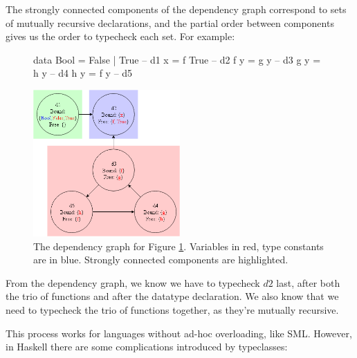 \documentclass[dissertation.tex]{subfiles}
\begin{document}
{{{            The strongly connected components of the dependency graph correspond to sets of mutually recursive
            declarations, and the partial order between components gives us the order to typecheck each set. For
            example:

            \begin{figure}[H]
                \begin{haskellfigure}
                data Bool = False | True    -- d1
                x = f True                  -- d2
                f y = g y                   -- d3
                g y = h y                   -- d4
                h y = f y                   -- d5
                \end{haskellfigure}
                \caption{}
                \label{code:dependency-graph}
            \end{figure}

            \begin{figure}[H]
                \includegraphics[width=0.5\textwidth]{figures/dependency_graph.png}
                \caption
                {
                    The dependency graph for Figure \ref{code:dependency-graph}. Variables in red, type
                    constants are in blue. Strongly connected components are highlighted.
                }
                \label{fig:dependency-graph}
            \end{figure}

            From the dependency graph, we know we have to typecheck \(d2\) last, after both the trio of functions and
            after the datatype declaration. We also know that we need to typecheck the trio of functions together, as
            they're mutually recursive.

            This process works for languages without ad-hoc overloading, like SML. However, in Haskell there are some
            complications introduced by typeclasses:

}}}
\end{document}
